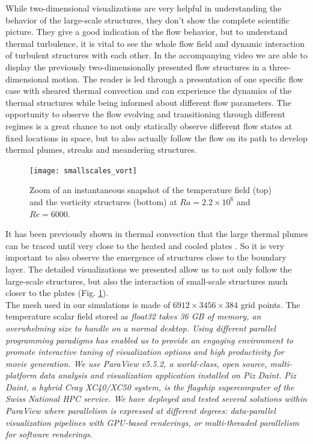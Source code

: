 \documentclass[final,5p,times,twocolumn]{elsarticle}
\begin{document}
While two-dimensional visualizations are very helpful in understanding the behavior of the large-scale structures, they don't show the complete scientific picture. They give a good indication of the flow behavior, but to understand thermal turbulence, it is vital to see the whole flow field and dynamic interaction of turbulent structures with each other.
In the accompanying video we are able to display the previously two-dimensionally presented flow structures in a three-dimensional motion. The reader is led through a presentation of one specific flow case with sheared thermal convection and can experience the dynamics of the thermal structures while being informed about different flow parameters. The opportunity to observe the flow evolving and transitioning through different regimes is a great chance to not only statically observe different flow states at fixed locations in space, but to also actually follow the flow on its path to develop thermal plumes, streaks and meandering structures.


\begin{figure}
	\centering
	\texttt{[image: smallscales\_vort]}%
	\caption{\label{fig:smallscale} Zoom of an instantaneous snapshot of the temperature field (top) and the vorticity structures (bottom) at $ Ra=2.2 \times 10^6 $ and $ Re=6000 $.}
\end{figure}

It has been previously shown in thermal convection that the large thermal plumes can be traced until very close to the heated and cooled plates \cite{ste18}. So it is very important to also observe the emergence of structures close to the boundary layer. The detailed visualizations we presented allow us to not only follow the large-scale structures, but also the interaction of small-scale structures much closer to the plates (Fig. \ref{fig:smallscale}).\\

The mesh used in our simulations is made of $ 6912 \times 3456 \times 384 $ grid points.
The temperature scalar field stored as \it{float32} \rm takes 36 GB of memory, an
overwhelming size to handle on a normal desktop. Using different parallel programming
paradigms has enabled us to provide an engaging environment
to promote interactive tuning of visualization options and high productivity for movie
generation. We use ParaView v5.5.2, a world-class, open source, multi-platform data analysis and
visualization application installed on Piz Daint. Piz Daint, a hybrid Cray XC40/XC50 system,
is the flagship supercomputer of the Swiss National HPC service. We have deployed
and tested several solutions within ParaView where parallelism is expressed
at different degrees: data-parallel visualization pipelines with GPU-based renderings,
or multi-threaded parallelism for software renderings.
\end{document}
